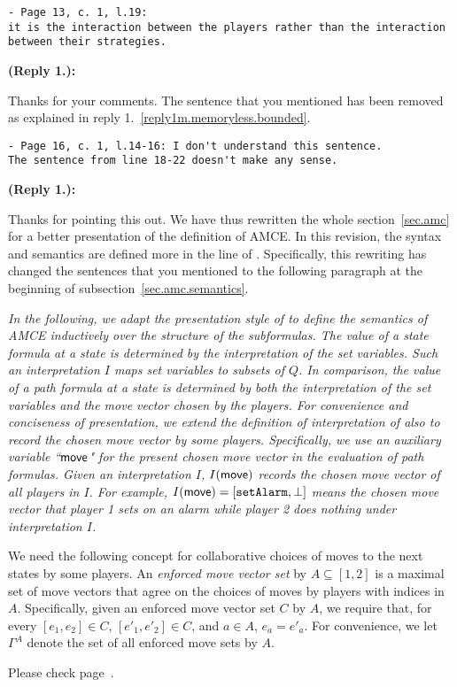\documentclass[times,10pt,twocolumn]{article}
\newcommand{\move}{\ensuremath{\sf move}}
\newcounter{cabbage0}
\newcounter{cabbage1}
\newcounter{cabbage2}
\newcounter{cabbage3}
\newcounter{bean0}
\newcounter{bean1}
\newcounter{bean2}
\newcounter{bean3}
\newcounter{bean4}
\newcounter{bean5}
\newcounter{bean6}
\newenvironment{reply1}{\begin{list}{\bf (Reply 1.\arabic{bean1}):} 
        {\usecounter{bean1}\setcounter{bean1}{\value{cabbage1}} \item \setcounter{cabbage1}{\value{bean1}} 
        }
}{\end{list}}
\begin{document}
\begin{verbatim} 
- Page 13, c. 1, l.19: 
it is the interaction between the players rather than the interaction 
between their strategies.
\end{verbatim}
\begin{reply1} 
Thanks for your comments. 
The sentence that you mentioned has been removed as 
explained in reply 1.~\ref{reply1m.memoryless.bounded}.  
\end{reply1} 
\begin{verbatim}
- Page 16, c. 1, l.14-16: I don't understand this sentence. 
The sentence from line 18-22 doesn't make any sense.
\end{verbatim}
\begin{reply1} 
Thanks for pointing this out. 
We have thus rewritten the whole section~\ref{sec.amc} for 
a better presentation of the definition of AMCE. 
In this revision, the syntax and semantics are defined more in the 
line of \cite{AHK02}.  
Specifically, this rewriting has changed the sentences that you mentioned 
to the following paragraph at the beginning of subsection~\ref{sec.amc.semantics}. 
\begin{center} 
\parbox{140mm}{\em 
In the following, we adapt the presentation style of \cite{AHK02} 
to define the semantics of AMCE inductively over the structure of the subformulas.  
The value of a state formula at a state is determined by the interpretation of the set variables.  
Such an interpretation $I$ maps set variables to subsets of $Q$.  
In comparison, the value of a path formula at a state 
is determined by both the interpretation
of the set variables and the move vector chosen by the players. 
For convenience and conciseness of presentation, 
we extend the definition of interpretation of \cite{AHK02} also to 
record the chosen move vector by some players. 
Specifically, we use an auxiliary variable ``$\move$"  
for the present chosen move vector in the evaluation of path formulas. 
Given an interpretation $I$, $I(\move)$ records the chosen move vector  
of all players in $I$.  
For example, $I(\move)=[\text{\tt setAlarm},\perp]$ 
means the chosen move vector 
that player 1 sets on an alarm while player 2 does nothing under interpretation $I$. 

We need the following concept for collaborative choices of moves 
to the next states by some players. 
An {\em enforced move vector set} by $A\subseteq [1,2]$ is 
a maximal set of move vectors that agree on the choices of moves 
by players with indices in $A$. 
Specifically, given an enforced move vector set $C$ by $A$, 
we require that, for every $[e_1,e_2]\in C$,  
$[e'_1,e'_2]\in C$, and $a\in A$, $e_a=e'_a$.  
For convenience, we let $\Gamma^A$ denote the set of all 
enforced move sets by $A$.    
}
\end{center}
Please check page~\pageref{reply1.semantics.dont.understand}.   
\end{reply1} 
\end{document}
